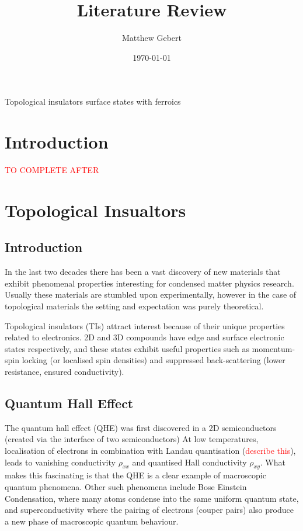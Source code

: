 \documentclass{article} %
\title{Literature Review}
\date{\today}
\author{Matthew Gebert}
\begin{document}
	\maketitle
	\begingroup
	\centering
		\vspace{5mm}\LARGE Topological insulators surface states with ferroics\\\vspace{1.5cm}	
	\endgroup
	\normalfont\normalsize
		
\section{Introduction}

\textcolor{red}{TO COMPLETE AFTER}

\section{Topological Insualtors}
\subsection{Introduction}
In the last two decades there has been a vast discovery of new materials that exhibit phenomenal properties interesting for condensed matter physics research. Usually these materials are stumbled upon experimentally, however in the case of topological materials the setting and expectation was purely theoretical.

Topological insulators (TIs) attract interest because of their unique properties related to electronics. 2D and 3D compounds have edge and surface electronic states respectively, and these states exhibit useful properties such as momentum-spin locking (or localised spin densities) and suppressed back-scattering (lower resistance, ensured conductivity).


\subsection{Quantum Hall Effect}

The quantum hall effect (QHE) was first discovered in a 2D semiconductors (created via the interface of two semiconductors) %
At low temperatures, localisation of electrons in combination with Landau quantisation (\textcolor{red}{describe this}), leads to vanishing conductivity $\rho_{xx}$ and quantised Hall conductivity $\rho_{xy}$.  %
What makes this fascinating is that the QHE is a clear example of macroscopic quantum phenomena. Other such phenomena include Bose Einstein Condensation, where many atoms condense into the same uniform quantum state, and superconductivity where the pairing of electrons (couper pairs) also produce a new phase of macroscopic quantum behaviour.
\end{document}
